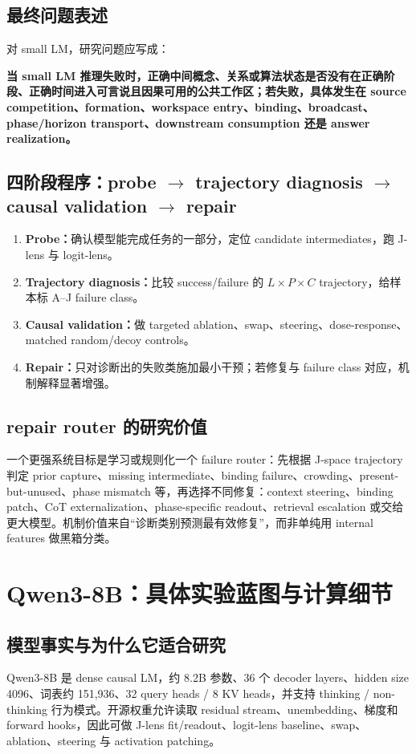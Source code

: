 \documentclass[10.5pt,a4paper]{ctexart}
\begin{document}
\subsection{最终问题表述}
对 small LM，研究问题应写成：
\begin{keybox}
\textbf{当 small LM 推理失败时，正确中间概念、关系或算法状态是否没有在正确阶段、正确时间进入可言说且因果可用的公共工作区；若失败，具体发生在 source competition、formation、workspace entry、binding、broadcast、phase/horizon transport、downstream consumption 还是 answer realization。}
\end{keybox}

\subsection{四阶段程序：probe $\to$ trajectory diagnosis $\to$ causal validation $\to$ repair}
\begin{enumerate}
  \item \textbf{Probe：}确认模型能完成任务的一部分，定位 candidate intermediates，跑 J-lens 与 logit-lens。
  \item \textbf{Trajectory diagnosis：}比较 success/failure 的 $L\times P\times C$ trajectory，给样本标 A--J failure class。
  \item \textbf{Causal validation：}做 targeted ablation、swap、steering、dose-response、matched random/decoy controls。
  \item \textbf{Repair：}只对诊断出的失败类施加最小干预；若修复与 failure class 对应，机制解释显著增强。
\end{enumerate}

\subsection{repair router 的研究价值}
一个更强系统目标是学习或规则化一个 failure router：先根据 J-space trajectory 判定 prior capture、missing intermediate、binding failure、crowding、present-but-unused、phase mismatch 等，再选择不同修复：context steering、binding patch、CoT externalization、phase-specific readout、retrieval escalation 或交给更大模型。机制价值来自“诊断类别预测最有效修复”，而非单纯用 internal features 做黑箱分类。


\section{Qwen3-8B：具体实验蓝图与计算细节}

\subsection{模型事实与为什么它适合研究}
Qwen3-8B 是 dense causal LM，约 8.2B 参数、36 个 decoder layers、hidden size 4096、词表约 151,936、32 query heads / 8 KV heads，并支持 thinking / non-thinking 行为模式。开源权重允许读取 residual stream、unembedding、梯度和 forward hooks，因此可做 J-lens fit/readout、logit-lens baseline、swap、ablation、steering 与 activation patching。
\end{document}

